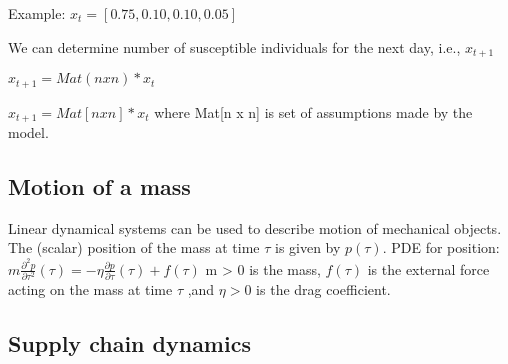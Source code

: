 Example: $x_{t} = [0.75, 0.10, 0.10, 0.05]$

We can determine number of susceptible individuals for the next day, i.e., $x_{t+1}$

$x_{t+1} = Mat(n x n)*x_{t}$

\newline

$x_{t+1} = Mat[n x n]*x_{t}$
where Mat[n x n] is set of assumptions made by the model.

\subsection{Motion of a mass}
Linear dynamical systems can be used to describe motion of mechanical objects. The (scalar) position of the mass at time $\tau$ is given by
$p(\tau )$.
PDE for position:
$m \frac{\partial^2 p}{\partial \tau^{2}} ( \tau ) =  -  \eta  \frac{\partial p}{\partial \tau} (\tau) +   f(\tau)$
m > 0 is the mass, $f(\tau )$ is the external force acting on the mass at time $\tau$ ,and $ \eta > 0$ is the drag coefficient.


\subsection{Supply chain dynamics}
